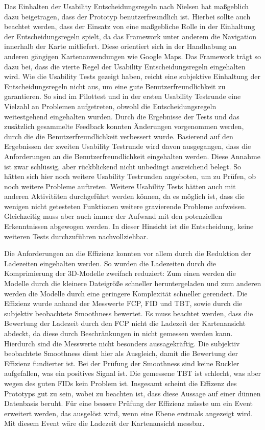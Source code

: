 Das Einhalten der Usability Entscheidungsregeln nach Nielsen \cite{Nielsen.1994} hat maßgeblich dazu beigetragen, dass der Prototyp benutzerfreundlich ist. Hierbei sollte auch beachtet werden, dass der Einsatz von \deckgl{} eine maßgebliche Rolle in der Einhaltung der Entscheidungsregeln spielt, da das Framework unter anderem die Navigation innerhalb der Karte mitliefert. Diese orientiert sich in der Handhabung an anderen gängigen Kartenanwendungen wie Google Maps. Das Framework trägt so dazu bei, dass die vierte Regel der Usability Entscheidungsregeln \cite[Regel 4]{Nielsen.1994} eingehalten wird. Wie die Usability Tests gezeigt haben, reicht eine subjektive Einhaltung der Entscheidungsregeln nicht aus, um eine gute Benutzerfreundlichkeit zu garantieren. So sind im Pilottest und in der ersten Usability Testrunde eine Vielzahl an Problemen aufgetreten, obwohl die Entscheidungsregeln weitestgehend eingehalten wurden. Durch die Ergebnisse der Tests und das zusätzlich gesammelte Feedback konnten Änderungen vorgenommen werden, durch die die Benutzerfreundlichkeit verbessert wurde. Basierend auf den Ergebnissen der zweiten Usability Testrunde wird davon ausgegangen, dass die Anforderungen an die Benutzerfreundlichkeit eingehalten werden. Diese Annahme ist zwar schlüssig, aber rückblickend nicht unbedingt ausreichend belegt. So hätten sich hier noch weitere Usability Testrunden angeboten, um zu Prüfen, ob noch weitere Probleme auftreten. Weitere Usability Tests hätten auch mit anderen Aktivitäten durchgeführt werden können, da es möglich ist, dass die wenigen nicht getesteten Funktionen weitere gravierende Probleme aufweisen. Gleichzeitig muss aber auch immer der Aufwand mit den potenziellen Erkenntnissen abgewogen werden. In dieser Hinsicht ist die Entscheidung, keine weiteren Tests durchzuführen nachvollziehbar.

Die Anforderungen an die Effizienz konnten vor allem durch die Reduktion der Ladezeiten eingehalten werden. So wurden die Ladezeiten durch die Komprimierung der 3D-Modelle zweifach reduziert: Zum einen werden die Modelle durch die kleinere Dateigröße schneller heruntergeladen und zum anderen werden die Modelle durch eine geringere Komplexität schneller gerendert. Die Effizienz wurde anhand der Messwerte \ac{FCP}, \ac{FID} und \ac{TBT}, sowie durch die subjektiv beobachtete Smoothness bewertet. Es muss beachtet werden, dass die Bewertung der Ladezeit durch den \ac{FCP} nicht die Ladezeit der Kartenansicht abdeckt, da diese durch Beschränkungen in \deckgl{} nicht gemessen werden kann. Hierdurch sind die Messwerte nicht besonders aussagekräftig. Die subjektiv beobachtete Smoothness dient hier als Ausgleich, damit die Bewertung der Effizienz fundierter ist. Bei der Prüfung der Smoothness sind keine Ruckler aufgefallen, was ein positives Signal ist. Die gemessene \ac{TBT} ist schlecht, was aber wegen des guten \ac{FID}s kein Problem ist. Insgesamt scheint die Effizenz des Prototyps gut zu sein, wobei zu beachten ist, dass diese Aussage auf einer dünnen Datenbasis beruht. Für eine bessere Prüfung der Effizienz müsste \deckgl{} um ein Event erweitert werden, das ausgelöst wird, wenn eine Ebene erstmals angezeigt wird. Mit diesem Event wäre die Ladezeit der Kartenansicht messbar.

